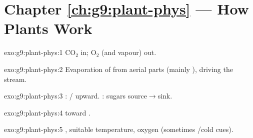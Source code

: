 \section*{Chapter \ref{ch:g9:plant-phys} --- How Plants Work}

\begin{solution}{exo:g9:plant-phys:1}
$\mathrm{CO_2}$ in; $\mathrm{O_2}$ (and  vapour) out.
\end{solution}

\begin{solution}{exo:g9:plant-phys:2}
Evaporation of  from aerial parts (mainly ), driving the
 stream.
\end{solution}

\begin{solution}{exo:g9:plant-phys:3}
: / upward. : sugars source$\to$sink.
\end{solution}

\begin{solution}{exo:g9:plant-phys:4}
  toward .
\end{solution}

\begin{solution}{exo:g9:plant-phys:5}
, suitable temperature, oxygen (sometimes /cold cues).
\end{solution}

